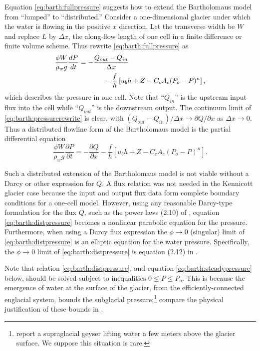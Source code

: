 \documentclass[twocolumn,letterpaper]{igs}
\begin{document}
Equation \eqref{eq:barth:fullpressure} suggests how to extend the Bartholomaus model from ``lumped'' to ``distributed.''  Consider a one-dimensional glacier under which the water is flowing in the positive $x$ direction.  Let the transverse width be $W$ and replace $L$ by $\Delta x$, the along-flow length of one cell in a finite difference or finite volume scheme.  Thus rewrite \eqref{eq:barth:fullpressure} as
\begin{align}
&\frac{\phi W}{\rho_w g}\frac{dP}{dt} = - \frac{Q_{out} - Q_{in}}{\Delta x}  \label{eq:barth:pressurerewrite} \\
&\qquad \qquad \qquad \quad - \frac{f}{h} \left[u_b h + Z - C_c A_c (P_o-P)^n\right], \notag
\end{align}
which describes the pressure in one cell.  Note that ``$Q_{in}$'' is the upstream input flux into the cell while ``$Q_{out}$'' is the downstream output.  The continuum limit of \eqref{eq:barth:pressurerewrite} is clear, with $(Q_{out} - Q_{in})/\Delta x \to \partial Q/\partial x$ as $\Delta x \to 0$.  Thus a distributed flowline form of the Bartholomaus model is the partial differential equation
\begin{equation}
\frac{\phi W}{\rho_w g} \frac{\partial P}{\partial t} = - \frac{\partial Q}{\partial x} - \frac{f}{h} \left[u_b h + Z - C_c A_c (P_o-P)^n\right]. \label{eq:barth:distpressure}
\end{equation}

Such a distributed extension of the Bartholomaus model is not viable without a Darcy or other expression for $Q$.  A flux relation was not needed in the Kennicott glacier case because the input and output flux data form complete boundary conditions for a one-cell model.  However, using any reasonable Darcy-type formulation for the flux $Q$, such as the power laws (2.10) of \cite{Schoofetal2012}, equation \eqref{eq:barth:distpressure} becomes a nonlinear parabolic equation for the pressure.  Furthermore, when using a Darcy flux expression the $\phi\to 0$ (singular) limit of \eqref{eq:barth:distpressure} is an elliptic equation for the water pressure.  Specifically, the $\phi\to 0$ limit of \eqref{eq:barth:distpressure} is equation (2.12) in \cite{Schoofetal2012}.

Note that relation \eqref{eq:barth:distpressure}, and equation \eqref{eq:barth:steadypressure} below, should be solved subject to inequalities $0 \le P \le P_o$.  This is because the emergence of water at the surface of the glacier, from the efficiently-connected englacial system, bounds the subglacial pressure;\footnote{\cite{Bartholomausetal2011} report a supraglacial geyser lifting water a few meters above the glacier surface.  We suppose this situation is rare.} compare the physical justification of these bounds in \cite{Schoofetal2012}.
\end{document}
